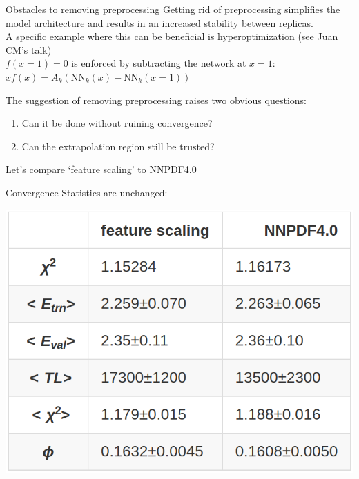 \documentclass[aspectratio=169,11pt]{beamer}
\newcommand{\nn}{\vspace*{1em}}
\begin{document}
\begin{frame}[t]{Obstacles to removing preprocessing}
  Getting rid of preprocessing simplifies the model architecture and results in an increased stability between replicas. \\ \nn
  A specific example where this can be beneficial is hyperoptimization (see Juan CM's talk) \\ \nn
  $f(x=1)=0$ is enforced by subtracting the network at $x=1$:\\
  $xf(x)=A_k\left(\mathrm{NN}_k(x) - \mathrm{NN}_k(x=1) \right)$ \\ \nn

  The suggestion of removing preprocessing raises two obvious questions:
  \begin{enumerate}
    \item Can it be done without ruining convergence?
    \item Can the extrapolation region still be trusted?
  \end{enumerate}
  \nn
  \begin{center}
    Let's {\color{blue} \underline{\href{https://vp.nnpdf.science/TVyAUeiNTk26IMYAfRNqLw==}{compare}}} `feature scaling' to NNPDF4.0
  \end{center}
\end{frame}


\begin{frame}[t]{Convergence}
  Statistics are unchanged:\\
  \begin{center}
    \includegraphics[height=0.5\textheight]{figures/summary_feature_vs_nnpdf40.png}
  \end{center}
\end{frame}
\end{document}
